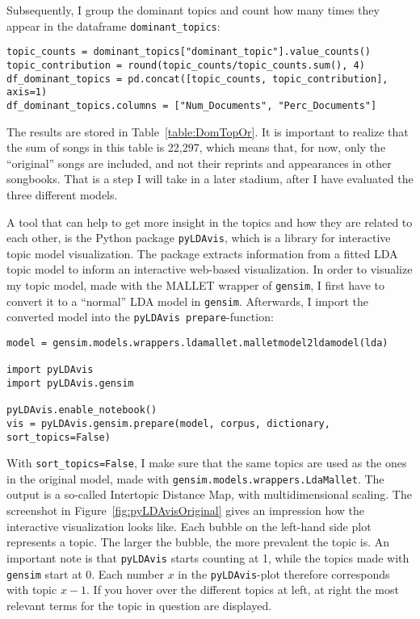 \noindent Subsequently, I group the dominant topics and count how many times they appear in the dataframe \texttt{dominant\_topics}:

\begin{lstlisting}
topic_counts = dominant_topics["dominant_topic"].value_counts()
topic_contribution = round(topic_counts/topic_counts.sum(), 4)
df_dominant_topics = pd.concat([topic_counts, topic_contribution], axis=1)
df_dominant_topics.columns = ["Num_Documents", "Perc_Documents"]
\end{lstlisting}

\noindent The results are stored in Table~\ref{table:DomTopOr}. It is important to realize that the sum of songs in this table is 22,297, which means that, for now, only the \enquote{original} songs are included, and not their reprints and appearances in other songbooks. That is a step I will take in a later stadium, after I have evaluated the three different models.

A tool that can help to get more insight in the topics and how they are related to each other, is the Python package \texttt{pyLDAvis}, which is a library for interactive topic model visualization. The package extracts information from a fitted LDA topic model to inform an interactive web-based visualization. In order to visualize my topic model, made with the MALLET wrapper of \texttt{gensim}, I first have to convert it to a \enquote{normal} LDA model in \texttt{gensim}. Afterwards, I import the converted model into the \texttt{pyLDAvis prepare}-function:

\begin{lstlisting}
model = gensim.models.wrappers.ldamallet.malletmodel2ldamodel(lda)

import pyLDAvis
import pyLDAvis.gensim

pyLDAvis.enable_notebook()
vis = pyLDAvis.gensim.prepare(model, corpus, dictionary, sort_topics=False)
\end{lstlisting}

\noindent With \texttt{sort\_topics=False}, I make sure that the same topics are used as the ones in the original model, made with \texttt{gensim.models.wrappers.LdaMallet}. The output is a so-called Intertopic Distance Map, with multidimensional scaling. The screenshot in Figure~\ref{fig:pyLDAvisOriginal} gives an impression how the interactive visualization looks like. Each bubble on the left-hand side plot represents a topic. The larger the bubble, the more prevalent the topic is. An important note is that \texttt{pyLDAvis} starts counting at 1, while the topics made with \texttt{gensim} start at 0. Each number $x$ in the \texttt{pyLDAvis}-plot therefore corresponds with topic $x-1$. If you hover over the different topics at left, at right the most relevant terms for the topic in question are displayed.

